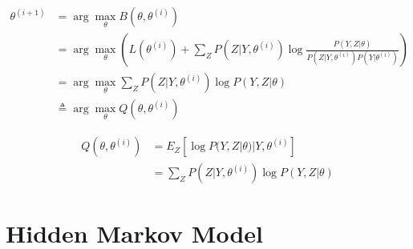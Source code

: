 \documentclass[11pt]{article}
\begin{document}
\begin{CJK*}{UTF8}{gbsn}
\begin{align*}
	\theta^{(i+1)} &= \arg\max_\theta B(\theta, \theta^{(i)})\\
	&= \arg\max_\theta\left( L(\theta^{(i)}) + \sum_Z P(Z|Y,\theta^{(i)}) \log \frac{P(Y,Z|\theta) }{P(Z|Y,\theta^{(i)}) P(Y|\theta^{(i)})}\right)\\
	&= \arg\max_\theta \sum_Z P(Z|Y,\theta^{(i)})  \log P(Y,Z|\theta)\\
	& \triangleq\arg\max_\theta Q(\theta, \theta^{(i)})
\end{align*}

\begin{align*}
	Q(\theta, \theta^{(i)}) &= E_Z\left[\log P(Y,Z|\theta)|Y,\theta^{(i)} \right]\\
	&=\sum_Z P(Z|Y,\theta^{(i)})  \log P(Y,Z|\theta)
\end{align*}

\section{Hidden Markov Model}








\end{CJK*}
\end{document}
